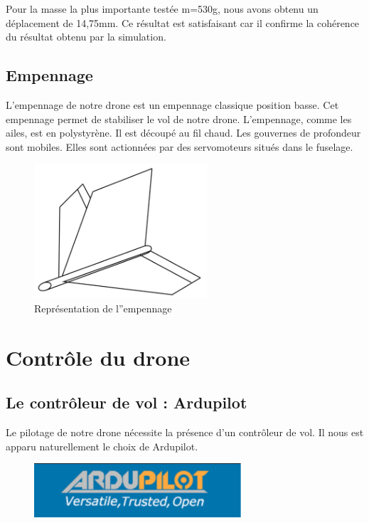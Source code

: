 \documentclass[a4paper,12pt,french]{report}
\begin{document}
Pour la masse la plus importante testée m=530g, nous avons obtenu un déplacement de 14,75mm.  Ce résultat est satisfaisant car il confirme la cohérence du résultat obtenu par la simulation.

\subsection{Empennage}

L'empennage de notre drone est un empennage classique position basse. Cet empennage permet de stabiliser le vol de notre drone. L'empennage, comme les ailes, est en polystyrène. Il est découpé au fil chaud. Les gouvernes de profondeur sont mobiles. Elles sont actionnées par des servomoteurs situés dans le fuselage.

\begin{figure}[h]
    \centering
    \includegraphics[height=5cm]{figures/emp.jpeg}
    \caption{Représentation de l''empennage}
    \label{emp}
\end{figure}

\newpage
\section{Contrôle du drone}

\subsection{Le contrôleur de vol : Ardupilot}

Le pilotage de notre drone nécessite la présence d’un contrôleur de vol. Il nous est apparu naturellement le choix de Ardupilot.

\begin{figure}[h]
    \centering
    \includegraphics[height=2cm]{figures/ardu.png}
\end{figure}
\end{document}
